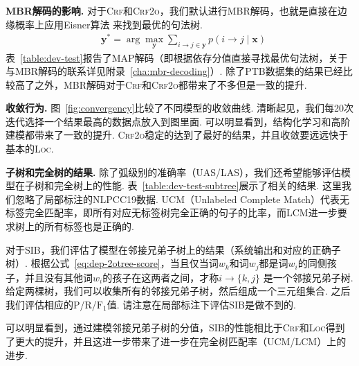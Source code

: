 \noindent\textbf{MBR解码的影响.}
对于\textsc{Crf}和\textsc{Crf2o}，我们默认进行MBR解码，也就是直接在边缘概率上应用Eisner算法 \citep{smith-smith-2007-probabilistic}来找到最优的句法树.
\begin{equation}
  \begin{split}
    & {\boldsymbol{y}}^* = \arg\max_{\boldsymbol{y}} \sum_{i \rightarrow j \in \boldsymbol{y}}{p(i \rightarrow j\mid\boldsymbol{x})}
  \end{split}
\end{equation}
表~\ref{table:dev-test}报告了MAP解码（即根据依存分值直接寻找最优句法树，关于与MBR解码的联系详见附录~\ref{cha:mbr-decoding}）.
除了PTB数据集的结果已经比较高了之外，MBR解码对于\textsc{Crf}和\textsc{Crf2o}都带来了不多但是一致的提升.

\noindent\textbf{收敛行为.}
图~\ref{fig:convergency}比较了不同模型的收敛曲线.
清晰起见，我们每20次迭代选择一个结果最高的数据点放入到图里面.
可以明显看到，结构化学习和高阶建模都带来了一致的提升.
\textsc{Crf2o}稳定的达到了最好的结果，并且收敛要远远快于基本的\textsc{Loc}.



\noindent\textbf{子树和完全树的结果.}
除了弧级别的准确率（UAS/LAS），我们还希望能够评估模型在子树和完全树上的性能.
表~\ref{table:dev-test-subtree}展示了相关的结果.
这里我们忽略了局部标注的NLPCC19数据.
UCM（Unlabeled Complete Match）代表无标签完全匹配率，即所有对应无标签树完全正确的句子的比率，而LCM进一步要求树上的所有标签也是正确的.

对于SIB，我们评估了模型在邻接兄弟子树上的结果（系统输出和对应的正确子树）.
根据公式~\ref{eq:dep-2otree-score}，当且仅当词$w_k$和词$w_j$都是词$w_i$的同侧孩子，并且没有其他词$w_i$的孩子在这两者之间，才称$i\rightarrow \{k,j\}$ 是一个邻接兄弟子树.
给定两棵树，我们可以收集所有的邻接兄弟子树，然后组成一个三元组集合.
之后我们评估相应的P/R/$\mathrm{F}_1$值.
请注意在局部标注下评估SIB是做不到的.

可以明显看到，通过建模邻接兄弟子树的分值，SIB的性能相比于\textsc{Crf}和\textsc{Loc}得到了更大的提升，并且这进一步带来了进一步在完全树匹配率（UCM/LCM）上的进步.

